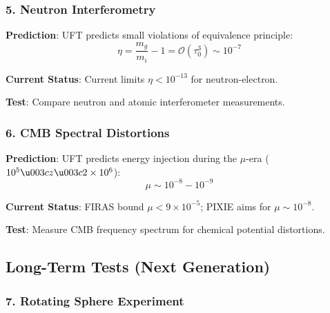 \subsubsection{5. Neutron Interferometry}

\begin{test}
\textbf{Prediction}: UFT predicts small violations of equivalence principle:
\begin{equation}
    \eta = \frac{m_g}{m_i} - 1 = \mathcal{O}(\tau_0^3) \sim 10^{-7}
\end{equation}

\textbf{Current Status}: Current limits $\eta < 10^{-13}$ for neutron-electron.

\textbf{Test}: Compare neutron and atomic interferometer measurements.
\end{test}

\subsubsection{6. CMB Spectral Distortions}

\begin{test}
\textbf{Prediction}: UFT predicts energy injection during the $\mu$-era ($10^5 \u003c z \u003c 2 \times 10^6$):
\begin{equation}
    \mu \sim 10^{-8} - 10^{-9}
\end{equation}

\textbf{Current Status}: FIRAS bound $\mu < 9 \times 10^{-5}$; PIXIE aims for $\mu \sim 10^{-8}$.

\textbf{Test}: Measure CMB frequency spectrum for chemical potential distortions.
\end{test}

\subsection{Long-Term Tests (Next Generation)}

\subsubsection{7. Rotating Sphere Experiment}

